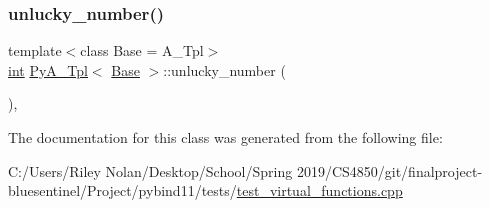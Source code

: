 \mbox{\label{class_py_a___tpl_ab1e973a0599fb37d199c7d9f598b56e2}} 
\subsubsection{\texorpdfstring{unlucky\_number()}{unlucky\_number()}}
{\footnotesize\ttfamily template$<$class Base  = A\+\_\+\+Tpl$>$ \\
\mbox{\hyperlink{warnings_8h_a74f207b5aa4ba51c3a2ad59b219a423b}{int}} \mbox{\hyperlink{class_py_a___tpl}{Py\+A\+\_\+\+Tpl}}$<$ \mbox{\hyperlink{struct_base}{Base}} $>$\+::unlucky\+\_\+number (\begin{DoxyParamCaption}{ }\end{DoxyParamCaption})\hspace{0.3cm}{\ttfamily [inline]}, {\ttfamily [override]}}



The documentation for this class was generated from the following file\+:\begin{DoxyCompactItemize}
\item 
C\+:/\+Users/\+Riley Nolan/\+Desktop/\+School/\+Spring 2019/\+C\+S4850/git/finalproject-\/bluesentinel/\+Project/pybind11/tests/\mbox{\hyperlink{test__virtual__functions_8cpp}{test\+\_\+virtual\+\_\+functions.\+cpp}}\end{DoxyCompactItemize}
